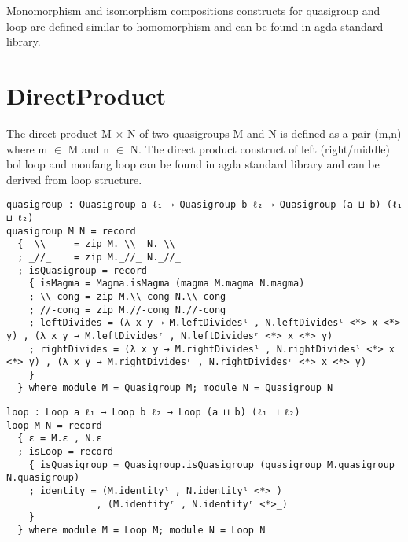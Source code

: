 
Monomorphism and isomorphism compositions constructs for quasigroup and loop are
defined similar to homomorphism and can be found in agda standard library.

\section{DirectProduct}
The direct product M \(\times\) N of two quasigroups M and N is defined as a
pair (m,n) where m \(\in\) M and n \(\in\) N. The direct product construct of
left (right/middle) bol loop and moufang loop can be found in agda standard
library and can be derived from loop structure.
\begin{verbatim}
quasigroup : Quasigroup a ℓ₁ → Quasigroup b ℓ₂ → Quasigroup (a ⊔ b) (ℓ₁ ⊔ ℓ₂)
quasigroup M N = record
  { _\\_    = zip M._\\_ N._\\_
  ; _//_    = zip M._//_ N._//_
  ; isQuasigroup = record
    { isMagma = Magma.isMagma (magma M.magma N.magma)
    ; \\-cong = zip M.\\-cong N.\\-cong
    ; //-cong = zip M.//-cong N.//-cong
    ; leftDivides = (λ x y → M.leftDividesˡ , N.leftDividesˡ <*> x <*> y) , (λ x y → M.leftDividesʳ , N.leftDividesʳ <*> x <*> y)
    ; rightDivides = (λ x y → M.rightDividesˡ , N.rightDividesˡ <*> x <*> y) , (λ x y → M.rightDividesʳ , N.rightDividesʳ <*> x <*> y)
    }
  } where module M = Quasigroup M; module N = Quasigroup N
\end{verbatim}
\begin{verbatim}
loop : Loop a ℓ₁ → Loop b ℓ₂ → Loop (a ⊔ b) (ℓ₁ ⊔ ℓ₂)
loop M N = record
  { ε = M.ε , N.ε
  ; isLoop = record
    { isQuasigroup = Quasigroup.isQuasigroup (quasigroup M.quasigroup N.quasigroup)
    ; identity = (M.identityˡ , N.identityˡ <*>_)
                , (M.identityʳ , N.identityʳ <*>_)
    }
  } where module M = Loop M; module N = Loop N
\end{verbatim}

